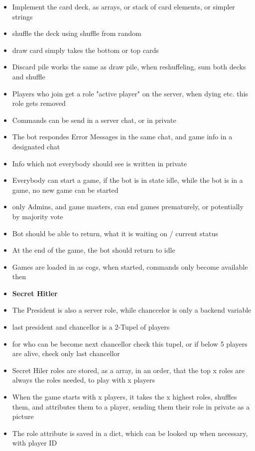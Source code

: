 \begin{itemize}
  \item Implement the card deck, as arrays, or stack of card elements, or simpler strings
  \item shuffle the deck using shuffle from random
  \item draw card simply takes the bottom or top cards
  \item Discard pile works the same as draw pile, when reshuffeling, sum both decks and shuffle
  \item Players who join get a role "active player" on the server,
    when dying etc. this role gets removed
  \item Commands can be send in a server chat, or in private
  \item The bot respondes Error Messages in the same chat, and game info in a designated chat
  \item Info which not everybody should see is written in private
  \item Everybody can start a game, if the bot is in state idle, while the bot is in a game, no
    new game can be started
  \item only Admins, and game masters, can end games prematurely, or potentially by majority vote
  \item Bot should be able to return, what it is waiting on / current status
  \item At the end of the game, the bot should return to idle
  \item Games are loaded in as cogs, when started, commands only become available then
    \newpage
  \item \textbf{Secret Hitler}
  \item The President is also a server role, while chanccelor is only a backend variable
  \item last president and chancellor is a 2-Tupel of players
  \item for who can be become next chancellor check this tupel, or if below 5 players are alive,
    check only last chancellor
  \item Secret Hiler roles are stored, as a array, in an order, that the top x roles are always
    the roles needed, to play with x players
  \item When the game starts with x players, it takes the x highest roles, shuffles them, and
    attributes them to a player, sending them their role in private as a picture
  \item The role attribute is saved in a dict, which can be looked up when necessary, with player ID

\end{itemize}
